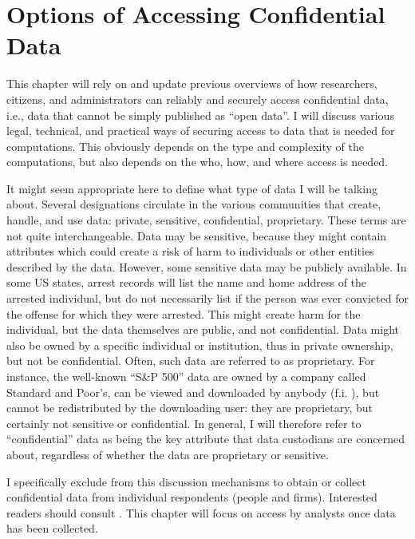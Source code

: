 \chapter{Options of Accessing Confidential Data}

This chapter will rely on and update previous overviews of how researchers, citizens, and administrators can reliably and securely access confidential data, i.e., data that cannot be simply published as ``open data''. I will discuss various legal, technical, and practical ways of securing access to data that is needed for computations. This obviously depends on the type and complexity of the computations, but also depends on the who, how, and where access is needed.

It might seem appropriate here to define what type of data I will be talking about. Several designations circulate in the various communities that create, handle, and use data: private, sensitive, confidential, proprietary. These terms are not quite interchangeable. Data may be sensitive, because they might contain attributes which could create a risk of harm to individuals or other entities described by the data. However, some sensitive data may be publicly available. In some US states, arrest records will list the name and home address of the arrested individual, but do not necessarily list if the person was ever convicted for the offense for which they were arrested. This might create harm for the individual, but the data themselves are public, and not confidential. Data might also be owned by a specific individual or institution, thus in private ownership, but not be confidential. Often, such data are referred to as proprietary. For instance, the well-known ``S\&P 500'' data are owned by a company called Standard and Poor's, can be viewed and downloaded by anybody (f.i. \cite{sp_dow_jones_indices_llc_sp_2020}), but cannot be redistributed by the downloading user: they are proprietary, but certainly not sensitive or confidential. In general, I will therefore refer to ``confidential'' data as being the key attribute that data custodians are concerned about, regardless of whether the data are proprietary or sensitive. 

I specifically exclude from this discussion mechanisms to obtain or collect confidential data from individual respondents (people and firms). Interested readers should consult \cite{groves_survey_2009}. This chapter will focus on access by analysts once data has been collected.


